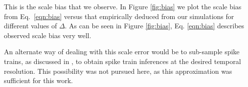 This is the scale bias that we observe. In Figure \ref{fig:bias} we plot the scale bias from Eq.~\ref{eqn:bias} versus that empirically deduced from our simulations for different values of $\Delta$. As can be seen in Figure \ref{fig:bias}, Eq. \ref{eqn:bias} describes observed scale bias very well.
	
An alternate way of dealing with this scale error would be to sub-sample spike trains, as discussed in \cite{Vogelstein2009}, to obtain spike train inferences at the desired temporal resolution.  This possibility was not pursued here, as this approximation was sufficient for this work.

